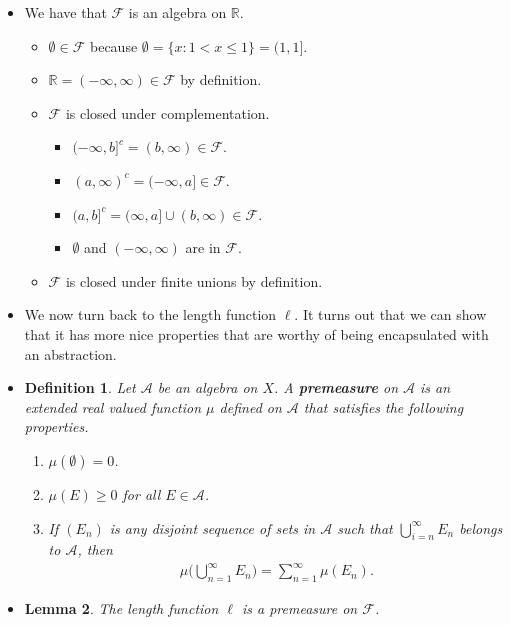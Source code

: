 \documentclass[10pt]{article}
\newtheorem{lemma}{Lemma}
\newtheorem{definition}[lemma]{Definition}
\newcommand{\mcal}[1]{\mathcal{#1}}
\newcommand{\Real}{\mathbb{R}}
\begin{document}
\begin{itemize}
  \item We have that $\mcal{F}$ is an algebra on $\Real$.
  \begin{itemize}
    \item $\emptyset \in \mcal{F}$ because $\emptyset = \{ x : 1 < x \leq 1 \} = (1,1]$.
    \item $\Real = (-\infty, \infty) \in \mcal{F}$ by definition.
    \item $\mcal{F}$ is closed under complementation.
    \begin{itemize}
      \item $(-\infty,b]^c = (b,\infty) \in \mcal{F}$.
      \item $(a,\infty)^c = (-\infty,a] \in \mcal{F}$.
      \item $(a,b]^c = (\infty,a] \cup (b,\infty) \in \mcal{F}$.
      \item $\emptyset$ and $(-\infty,\infty)$ are in $\mcal{F}$.
    \end{itemize}

    \item $\mcal{F}$ is closed under finite unions by definition.
  \end{itemize}

  \item We now turn back to the length function $\ell$. It turns out that we can show that it has more nice properties that are worthy of being encapsulated with an abstraction.

  \item \begin{definition}
    Let $\mcal{A}$ be an algebra on $X$. A {\bf premeasure} on $\mcal{A}$ is an extended real valued function $\mu$ defined on $\mcal{A}$ that satisfies the following properties.
    \begin{enumerate}
      \item $\mu(\emptyset) = 0$.
      \item $\mu(E) \geq 0$ for all $E \in \mcal{A}$.
      \item If $(E_n)$ is any disjoint sequence of sets in $\mcal{A}$ such that $\bigcup_{i=n}^\infty E_n$ belongs to $\mcal{A}$, then
      \begin{align*}
        \mu\bigg( \bigcup_{n=1}^\infty E_n \bigg) = \sum_{n=1}^\infty \mu(E_n).
      \end{align*}
    \end{enumerate}
  \end{definition}

  \item \begin{lemma}
  The length function $\ell$ is a premeasure on $\mcal{F}$.
  \end{lemma}


\end{itemize}
\end{document}

